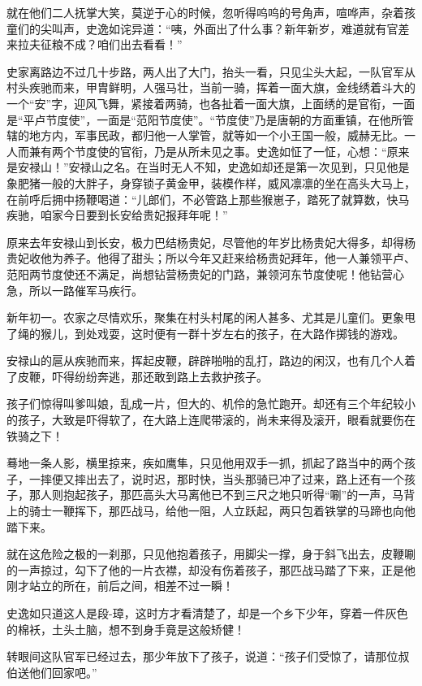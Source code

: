 \documentclass[12pt,oneside]{book}
\begin{document}
就在他们二人抚掌大笑，莫逆于心的时候，忽听得呜呜的号角声，喧哗声，杂着孩童们的尖叫声，史逸如诧异道：``咦，外面出了什么事？新年新岁，难道就有官差来拉夫征粮不成？咱们出去看看！''

史家离路边不过几十步路，两人出了大门，抬头一看，只见尘头大起，一队官军从村头疾驰而来，甲胄鲜明，人强马壮，当前一骑，挥着一面大旗，金线绣着斗大的一个``安''字，迎风飞舞，紧接着两骑，也各扯着一面大旗，上面绣的是官衔，一面是``平卢节度使''，一面是``范阳节度使''。``节度使''乃是唐朝的方面重镇，在他所管辖的地方内，军事民政，都归他一人掌管，就等如一个小王国一般，威赫无比。一人而兼有两个节度使的官衔，乃是从所未见之事。史逸如怔了一怔，心想：``原来是安禄山！''安禄山之名。在当时无人不知，史逸如却还是第一次见到，只见他是象肥猪一般的大胖子，身穿锁子黄金甲，装模作样，威风凛凛的坐在高头大马上，在前呼后拥中扬鞭喝道：``儿郎们，不必管路上那些猴崽子，踏死了就算数，快马疾驰，咱家今日要到长安给贵妃报拜年呢！''

原来去年安禄山到长安，极力巴结杨贵妃，尽管他的年岁比杨贵妃大得多，却得杨贵妃收他为养子。他得了甜头；所以今年又赶来给杨贵妃拜年，他一人兼领平卢、范阳两节度使还不满足，尚想钻营杨贵妃的门路，兼领河东节度使呢！他钻营心急，所以一路催军马疾行。

新年初一。农家之尽情欢乐，聚集在村头村尾的闲人甚多、尤其是儿童们。更象甩了绳的猴儿，到处戏耍，这时便有一群十岁左右的孩子，在大路作掷钱的游戏。

安禄山的扈从疾驰而来，挥起皮鞭，辟辟啪啪的乱打，路边的闲汉，也有几个人着了皮鞭，吓得纷纷奔逃，那还敢到路上去救护孩子。

孩子们惊得叫爹叫娘，乱成一片，但大的、机伶的急忙跑开。却还有三个年纪较小的孩子，大致是吓得软了，在大路上连爬带滚的，尚未来得及滚开，眼看就要伤在铁骑之下！

蓦地一条人影，横里掠来，疾如鹰隼，只见他用双手一抓，抓起了路当中的两个孩子，一摔便又摔出去了，说时迟，那时快，当头那骑已冲了过来，路上还有一个孩子，那人则抱起孩子，那匹高头大马离他已不到三尺之地只听得``唰''的一声，马背上的骑士一鞭挥下，那匹战马，给他一阻，人立跃起，两只包着铁掌的马蹄也向他踏下来。

就在这危险之极的一刹那，只见他抱着孩子，用脚尖一撑，身于斜飞出去，皮鞭唰的一声掠过，勾下了他的一片衣襟，却没有伤着孩子，那匹战马踏了下来，正是他刚才站立的所在，前后之间，相差不过一瞬！

史逸如只道这人是段-璋，这时方才看清楚了，却是一个乡下少年，穿着一件灰色的棉袄，土头土脑，想不到身手竟是这般矫健！

转眼间这队官军已经过去，那少年放下了孩子，说道：``孩子们受惊了，请那位叔伯送他们回家吧。''
\end{document}
